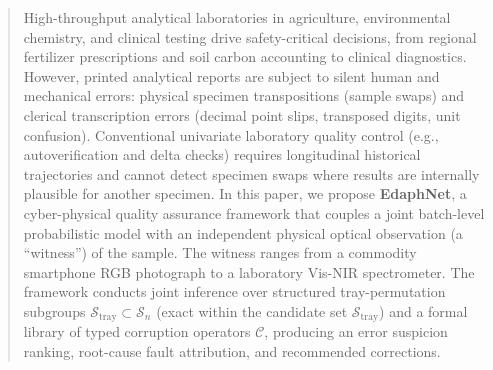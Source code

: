 \documentclass[journal,twoside]{IEEEtran}
\begin{document}
\begin{abstract}
High-throughput analytical laboratories in agriculture, environmental chemistry, and clinical testing drive safety-critical decisions, from regional fertilizer prescriptions and soil carbon accounting to clinical diagnostics. However, printed analytical reports are subject to silent human and mechanical errors: physical specimen transpositions (sample swaps) and clerical transcription errors (decimal point slips, transposed digits, unit confusion). Conventional univariate laboratory quality control (e.g., autoverification and delta checks) requires longitudinal historical trajectories and cannot detect specimen swaps where results are internally plausible for another specimen. In this paper, we propose \textbf{EdaphNet}, a cyber-physical quality assurance framework that couples a joint batch-level probabilistic model with an independent physical optical observation (a ``witness'') of the sample. The witness ranges from a commodity smartphone RGB photograph to a laboratory Vis-NIR spectrometer. The framework conducts joint inference over structured tray-permutation subgroups $\mathcal{S}_{\text{tray}} \subset \mathcal{S}_n$ (exact within the candidate set $\mathcal{S}_{\text{tray}}$) and a formal library of typed corruption operators $\mathcal{C}$, producing an error suspicion ranking, root-cause fault attribution, and recommended corrections. 


\end{abstract}
\end{document}
